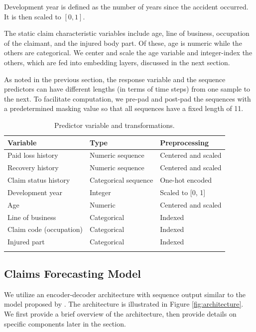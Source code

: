 \documentclass{article}
\begin{document}
Development year is defined as the number of years since the accident occurred. It is then scaled to $[0, 1]$.

The static claim characteristic variables include age, line of business, occupation of the claimant, and the injured body part. Of these, age is numeric while the others are categorical. We center and scale the age variable and integer-index the others, which are fed into embedding layers, discussed in the next section.

As noted in the previous section, the response variable and the sequence predictors can have different lengths (in terms of time steps) from one sample to the next. To facilitate computation, we pre-pad and post-pad the sequences with a predetermined masking value so that all sequences have a fixed length of 11.

\begin{table}[ht]
\centering
\begin{tabular}[t]{lll}
\toprule
Variable & Type & Preprocessing\\
\midrule
Paid loss history      & Numeric sequence         & Centered and scaled\\
Recovery history       & Numeric sequence         & Centered and scaled\\
Claim status history   & Categorical sequence     & One-hot encoded\\
Development year       & Integer                  & Scaled to [0, 1]\\
Age                    & Numeric                  & Centered and scaled\\
Line of business       & Categorical              & Indexed\\
Claim code (occupation)& Categorical              & Indexed\\
Injured part           & Categorical              & Indexed\\
\bottomrule\\[1ex]
\end{tabular}
\caption{Predictor variable and transformations.}
\label{table:vars}
\end{table}%

\subsection{Claims Forecasting Model}\label{sec:claims-forecasting-model}

We utilize an encoder-decoder architecture with sequence output similar to the model proposed by \cite{kuo2018deeptriangle}. The architecture is illustrated in Figure \ref{fig:architecture}. We first provide a brief overview of the architecture, then provide details on specific components later in the section.
\end{document}
